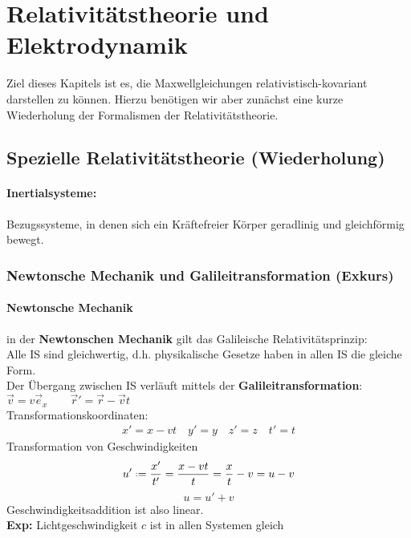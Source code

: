 \chapter{Relativitätstheorie und Elektrodynamik}

Ziel dieses Kapitels ist es, die Maxwellgleichungen relativistisch-kovariant darstellen zu können. Hierzu benötigen wir aber zunächst eine kurze Wiederholung der Formalismen der Relativitätstheorie.

\section{Spezielle Relativitätstheorie (Wiederholung)}

\subsubsection{Inertialsysteme:}

Bezugssysteme, in denen sich ein Kräftefreier Körper geradlinig und gleichförmig bewegt.

\subsection{Newtonsche Mechanik und Galileitransformation (Exkurs)}

\subsubsection{Newtonsche Mechanik}

in der \textbf{Newtonschen Mechanik} gilt das Galileische Relativitätsprinzip:\\
Alle IS sind gleichwertig, d.h. physikalische Gesetze haben in allen IS die gleiche Form.\\[5pt]
Der Übergang zwischen IS verläuft mittels der \textbf{Galileitransformation}:
%
%
%
%
%
%
$ \vec{v} = v \vec{e}_x \qquad \vec{r}' = \vec{r} - \vec{v}t $\\
Transformationskoordinaten:
\begin{align*}
x' = x - vt \quad y' = y \quad z' = z \quad t' = t
\end{align*}
Transformation von Geschwindigkeiten
%
%
%
%
%
%
\begin{equation*}
u' \defeq \frac{x'}{t'} = \frac{x - vt}{t} = \frac{x}{t} - v = u - v
\end{equation*}
\begin{equation*}
u = u' + v
\end{equation*}
Geschwindigkeitsaddition ist also linear.\\[5pt]
\textbf{Exp:} Lichtgeschwindigkeit $ c $ ist in allen Systemen gleich \LARGE \lightning \normalsize

